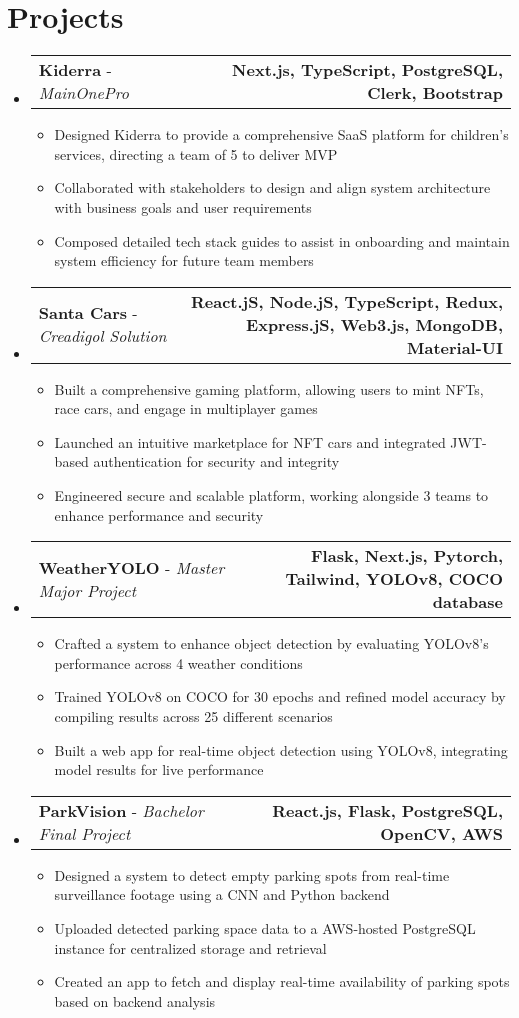 \documentclass[letterpaper,11pt]{article}
\makeatletter
\newcommand{\resumeItem}[1]{
  \item\small{
    {#1 \vspace{-2pt}}
  }
}
\newcommand{\resumeProjectHeading}[2]{
    \item
    \begin{tabular*}{1.001\textwidth}{l@{\extracolsep{\fill}}r}
      \small#1 & \textbf{\small #2}\\
    \end{tabular*}\vspace{-7pt}
}
\newcommand{\resumeSubHeadingListStart}{\begin{itemize}[leftmargin=0.0in, label={}]}
\newcommand{\resumeSubHeadingListEnd}{\end{itemize}}
\newcommand{\resumeItemListStart}{\begin{itemize}}
\newcommand{\resumeItemListEnd}{\end{itemize}\vspace{-5pt}}
\makeatother
\begin{document}
\section{Projects}
\vspace{-6pt}
\resumeSubHeadingListStart
    \resumeProjectHeading
        {\textbf{Kiderra} - \emph{MainOnePro}}{Next.js, TypeScript, PostgreSQL, Clerk, Bootstrap}
        \resumeItemListStart
        \resumeItem{Designed Kiderra to provide a comprehensive SaaS platform for children's services, directing a team of 5 to deliver MVP}
        \resumeItem{Collaborated with stakeholders to design and align system architecture with business goals and user requirements}
        \resumeItem{Composed detailed tech stack guides to assist in onboarding and maintain system efficiency for future team members}
        \resumeItemListEnd
        \vspace{-16pt}
    \resumeProjectHeading
        {\textbf{Santa Cars} - \emph{Creadigol Solution}}{React.jS, Node.jS, TypeScript, Redux, Express.jS, Web3.js, MongoDB, Material-UI}
        \resumeItemListStart
          \resumeItem{Built a comprehensive gaming platform, allowing users to mint NFTs, race cars, and engage in multiplayer games}
          \resumeItem{Launched an intuitive marketplace for NFT cars and integrated JWT-based authentication for security and integrity}
          \resumeItem{Engineered secure and scalable platform, working alongside 3 teams to enhance performance and security}
        \resumeItemListEnd
        \vspace{-16pt}
    \resumeProjectHeading
        {\textbf{WeatherYOLO} - \emph{Master Major Project}}{Flask, Next.js, Pytorch, Tailwind, YOLOv8, COCO database}
        \resumeItemListStart
          \resumeItem{Crafted a system to enhance object detection by evaluating YOLOv8’s performance across 4 weather conditions}
          \resumeItem{Trained YOLOv8 on COCO for 30 epochs and refined model accuracy by compiling results across 25 different scenarios}
          \resumeItem{Built a web app for real-time object detection using YOLOv8, integrating model results for live performance}
        \resumeItemListEnd
        \vspace{-16pt}
    \resumeProjectHeading
        {\textbf{ParkVision} - \emph{Bachelor Final Project}}{React.js, Flask, PostgreSQL, OpenCV, AWS}
        \resumeItemListStart
          \resumeItem{Designed a system to detect empty parking spots from real-time surveillance footage using a CNN and Python backend}
          \resumeItem{Uploaded detected parking space data to a AWS-hosted PostgreSQL instance for centralized storage and retrieval}
          \resumeItem{Created an app to fetch and display real-time availability of parking spots based on backend analysis}
        \resumeItemListEnd
  \resumeSubHeadingListEnd
\vspace{-15pt}
\end{document}
